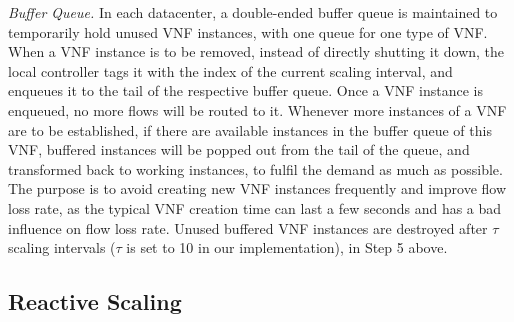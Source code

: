 \vspace{1mm}
\textit{Buffer Queue.} In each datacenter, a double-ended buffer queue is maintained to temporarily hold unused VNF instances, with one queue for one type of VNF. When a VNF instance is to be removed, instead of directly shutting it down, the local controller tags it with the index of the current scaling interval, and enqueues it to the tail of the respective buffer queue. Once a VNF instance is enqueued, no more flows will be routed to it. Whenever more instances of a VNF are to be established, if there are available instances in the buffer queue of this VNF, buffered instances will be popped out from the tail of the queue, and transformed back to working instances, to fulfil the demand as much as possible. The purpose is to avoid creating new VNF instances frequently and improve flow loss rate, as the typical VNF creation time can last a few seconds and has a bad influence on flow loss rate. Unused buffered VNF instances are destroyed after $\tau$ scaling intervals ($\tau$ is set to 10 in our implementation), in Step 5 above.

\vspace{-3mm}
\subsection{Reactive Scaling}
\label{sec:CP_reactivescale}

